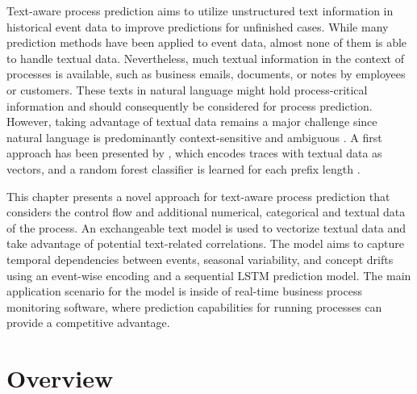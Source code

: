 Text-aware process prediction aims to utilize unstructured text information in historical event data to improve predictions for unfinished cases.
While many prediction methods have been applied to event data, almost none of them is able to handle textual data.
Nevertheless, much textual information in the context of processes is available, such as business emails, documents, or notes by employees or customers.
These texts in natural language might hold process-critical information and should consequently be considered for process prediction.
However, taking advantage of textual data remains a major challenge since natural language is predominantly context-sensitive and ambiguous \cite{textminingissues}.
A first approach has been presented by \citeauthor{DBLP:conf/bpm/TeinemaaDMF16}, which encodes traces with textual data as vectors, and a random forest classifier is learned for each prefix length \cite{DBLP:conf/bpm/TeinemaaDMF16}.

This chapter presents a novel approach for text-aware process prediction that considers the control flow and additional numerical, categorical and textual data of the process.
An exchangeable text model is used to vectorize textual data and take advantage of potential text-related correlations.
The model aims to capture temporal dependencies between events, seasonal variability, and concept drifts using an event-wise encoding and a sequential LSTM prediction model.
The main application scenario for the model is inside of real-time business process monitoring software, where prediction capabilities for running processes can provide a competitive advantage.

\section{Overview}\label{sec:overview}

